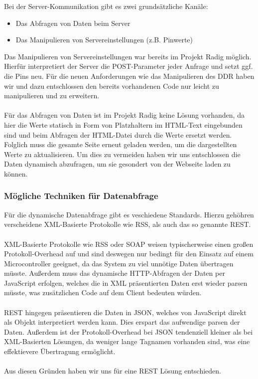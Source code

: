 Bei der Server-Kommunikation gibt es zwei grundsätzliche Kanäle:
\begin{itemize}
  \item Das Abfragen von Daten beim Server
  \item Das Manipulieren von Servereinstellungen (z.B. Pinwerte)
\end{itemize}
Das Manipulieren von Servereinstellungen war bereits im Projekt Radig möglich.
Hierfür interpretiert der Server die POST-Parameter jeder Anfrage und setzt ggf.
die Pins neu. Für die neuen Anforderungen wie das Manipulieren des DDR haben
wir und dazu entschlossen den bereits vorhandenen Code nur leicht zu
manipulieren und zu erweitern.\\
\\
Für das Abfragen von Daten ist im Projekt Radig keine Lösung vorhanden, da hier
die Werte statisch in Form von Platzhaltern im HTML-Text eingebunden sind und
beim Abfragen der HTML-Datei durch die Werte ersetzt werden. Folglich muss die
gesamte Seite erneut geladen werden, um die dargestellten Werte zu
aktualisieren. Um dies zu vermeiden haben wir uns entschlossen die Daten
dynamisch abzufragen, um sie gesondert von der Webseite laden zu können.

\subsubsection{Mögliche Techniken für Datenabfrage}

Für die dynamische Datenabfrage gibt es veschiedene Standards. Hierzu gehöhren
verscheidene XML-Basierte Protokolle wie RSS, als auch das so genannte
REST.\\
\\
XML-Basierte Protokolle wie RSS oder SOAP weisen typischerweise einen großen
Protokoll-Overhead auf und sind deswegen nur bedingt für den Einsatz auf einem
Microcontroller geeignet, da das System zu viel unnötige Daten übertragen
müsste. Außerdem muss das dynamische HTTP-Abfragen der Daten per JavaScript
erfolgen, welches die in XML präsentierten Daten erst wieder parsen müsste, was
zusätzlichen Code auf dem Client bedeuten würden.\\
\\
REST hingegen präsentieren die Daten in JSON, welches von
JavaScript direkt als Objekt interpretiert werden kann. Dies erspart das
aufwendige parsen der Daten. Außerdem ist der Protokoll-Overhead bei JSON
tendenziell kleiner als bei XML-Basierten Lösungen, da weniger lange Tagnamen
vorhanden sind, was eine effektievere Übertragung ermöglicht.\\
\\
Aus diesen Gründen haben wir uns für eine REST Lösung entschieden.

